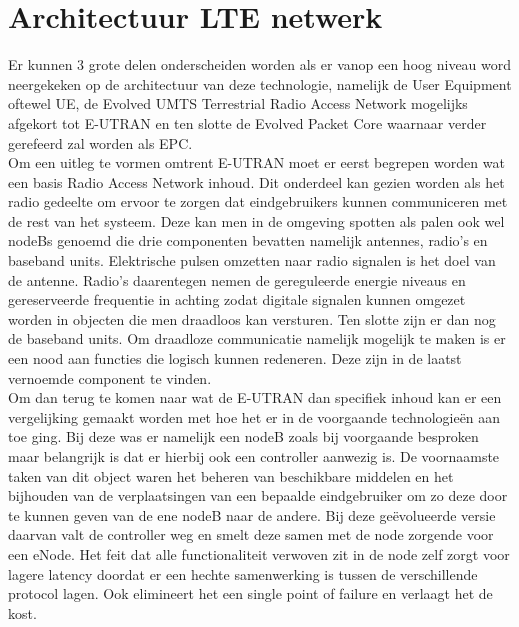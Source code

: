 \section{Architectuur LTE netwerk}

Er kunnen 3 grote delen onderscheiden worden als er vanop een hoog niveau word neergekeken op de architectuur van deze technologie, namelijk de User Equipment oftewel UE, de Evolved UMTS Terrestrial Radio Access Network mogelijks afgekort tot E-UTRAN en ten slotte de Evolved Packet Core waarnaar verder gerefeerd zal worden als EPC. \autocite{Richard2021} \\

Om een uitleg te vormen omtrent E-UTRAN moet er eerst begrepen worden wat een basis Radio Access Network inhoud. Dit onderdeel kan gezien worden als het radio gedeelte om ervoor te zorgen dat eindgebruikers kunnen communiceren met de rest van het systeem. Deze kan men in de omgeving spotten als palen ook wel nodeBs genoemd die drie componenten bevatten namelijk antennes, radio's en baseband units. Elektrische pulsen omzetten naar radio signalen is het doel van de antenne. Radio's daarentegen nemen de gereguleerde energie niveaus en gereserveerde frequentie in achting zodat digitale signalen kunnen omgezet worden in objecten die men draadloos kan versturen. Ten slotte zijn er dan nog de baseband units. Om draadloze communicatie namelijk mogelijk te maken is er een nood aan functies die logisch kunnen redeneren. Deze zijn in de laatst vernoemde component te vinden. \autocite{Jones2021} \\

Om dan terug te komen naar wat de E-UTRAN dan specifiek inhoud kan er een vergelijking gemaakt worden met hoe het er in de voorgaande technologieën aan toe ging. Bij deze was er namelijk een nodeB zoals bij voorgaande besproken maar belangrijk is dat er hierbij ook een controller aanwezig is. De voornaamste taken van dit object waren het beheren van beschikbare middelen en het bijhouden van de verplaatsingen van een bepaalde eindgebruiker om zo deze door te kunnen geven van de ene nodeB naar de andere. Bij deze geëvolueerde versie daarvan valt de controller weg en smelt deze samen met de node zorgende voor een eNode. \autocite{Ghayas2019} Het feit dat alle functionaliteit verwoven zit in de node zelf zorgt voor lagere latency doordat er een hechte samenwerking is tussen de verschillende protocol lagen. Ook elimineert het een single point of failure en verlaagt het de kost. \autocite{Palat2011} \\

